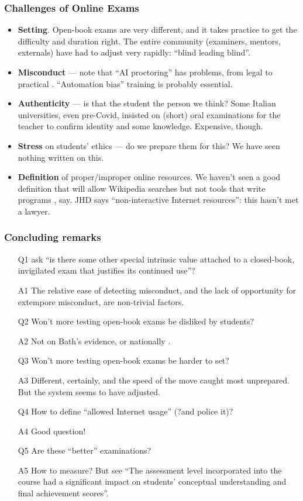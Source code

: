 \begin{frame}[fragile]
\frametitle{Challenges of Online Exams}
\pause
\begin{itemize}[<+->]
\item{\bf Setting}. Open-book exams are very different, and it takes practice to get the difficulty and duration right. The entire community (examiners, mentors, externals) have had to adjust very rapidly: ``blind leading blind''.
\item{\bf Misconduct} --- note that ``AI proctoring'' has problems, from legal \cite{JISC2022a} to practical \cite{NewYorkTimes2022l}.  ``Automation bias'' training is probably essential.
\item{\bf Authenticity} --- is that the student the person we think? Some Italian universities, even pre-Covid, insisted on (short) oral examinations for the teacher to confirm identity and some knowledge.  Expensive, though.
\item{\bf Stress} on students' ethics --- do we prepare them for this? We have seen nothing written on this.
\item{\bf Definition} of proper/improper online resources. We haven't seen a good definition that will allow Wikipedia searches but not tools that write programs \cite{FinnieAnsleyetal2022a}, say.  JHD says ``non-interactive Internet resources'': this hasn't met a lawyer.
\end{itemize}
\end{frame}
\begin{frame}[fragile]
\frametitle{Concluding remarks}
\begin{itemize}[<+->]
	\item[Q1]\cite{WilliamsWong2009a} ask ``is there some other special intrinsic value attached to a closed-book, invigilated exam that justifies its continued use''?
	\item[A1]The relative ease of detecting misconduct, and the lack of opportunity for extempore misconduct, are non-trivial factors.
	\item[Q2]Won't more testing open-book exams be disliked by students?
	\item[A2]Not on Bath's evidence, or nationally \cite{JISC2022a}.
	\item[Q3]Won't more testing open-book exams be harder to set?
	\item[A3]Different, certainly, and the speed of the move caught most unprepared. But the system seems to have adjusted.
	\item[Q4]How to define ``allowed Internet usage'' (?and police it)?
	\item[A4]Good question!
\item[Q5]Are these ``better'' examinations?
\item[A5]How to measure? But see \cite{Jensenetal2014a} ``The assessment level incorporated into the course had a significant impact on students' conceptual understanding and final achievement scores''.
\end{itemize}
\end{frame}

